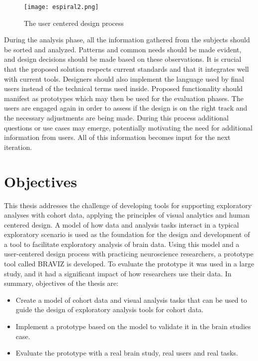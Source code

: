 \begin{figure}
\centering
\texttt{[image: espiral2.png]}
\caption{ \label{intro_spiral} The user centered design process}
\end{figure}

During the analysis phase, all the information gathered from the subjects should be sorted and analyzed. Patterns and common needs should be made evident, and design decisions should be made based on these observations. It is crucial that the proposed solution respects current standards and that it integrates well with current tools. Designers should also implement the language used by final users instead of the technical terms used inside.  Proposed functionality should manifest as prototypes which may then be used for the evaluation phases. The users are engaged again in order to assess if the design is on the right track and the necessary adjustments are being made. During this process additional questions or use cases may emerge, potentially motivating the need for additional information from users. All of this information becomes input for the next iteration.


\section{Objectives}

This thesis addresses the challenge of developing tools for supporting exploratory analyses with cohort data, applying the principles of visual analytics and human centered design. A model of how data and analysis tasks interact in a typical exploratory scenario is used as the foundation for the design and development of a tool to facilitate exploratory analysis of brain data. Using this model and a user-centered design process with practicing neuroscience researchers, a prototype tool called BRAVIZ is developed. To evaluate the prototype it was used in a large study, and it had a significant impact of how researchers use their data. In summary, objectives of the thesis are:

\begin{itemize}
\item Create a model of cohort data and visual analysis tasks that can be used to guide the design of exploratory analysis tools for cohort data.

\item Implement a prototype based on the model to validate it in the brain studies case.

\item Evaluate the prototype with a real brain study, real users and real tasks.

\end{itemize}

